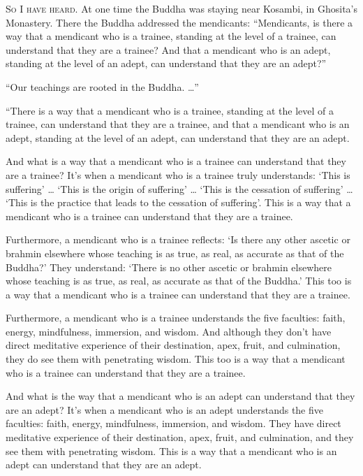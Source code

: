 \documentclass[12pt,openany]{book}%
\newcommand*{\scevam}[1]{\textsc{#1}}
\begin{document}
\scevam{So I have heard. }At one time the Buddha was staying near Kosambi, in Ghosita’s Monastery. There the Buddha addressed the mendicants: “Mendicants, is there a way that a mendicant who is a trainee, standing at the level of a trainee, can understand that they are a trainee? And that a mendicant who is an adept, standing at the level of an adept, can understand that they are an adept?” 

“Our teachings are rooted in the Buddha. …” 

“There is a way that a mendicant who is a trainee, standing at the level of a trainee, can understand that they are a trainee, and that a mendicant who is an adept, standing at the level of an adept, can understand that they are an adept. 

And what is a way that a mendicant who is a trainee can understand that they are a trainee? It’s when a mendicant who is a trainee truly understands: ‘This is suffering’ … ‘This is the origin of suffering’ … ‘This is the cessation of suffering’ … ‘This is the practice that leads to the cessation of suffering’. This is a way that a mendicant who is a trainee can understand that they are a trainee. 

Furthermore, a mendicant who is a trainee reflects: ‘Is there any other ascetic or brahmin elsewhere whose teaching is as true, as real, as accurate as that of the Buddha?’ They understand: ‘There is no other ascetic or brahmin elsewhere whose teaching is as true, as real, as accurate as that of the Buddha.’ This too is a way that a mendicant who is a trainee can understand that they are a trainee. 

Furthermore, a mendicant who is a trainee understands the five faculties: faith, energy, mindfulness, immersion, and wisdom. And although they don’t have direct meditative experience of their destination, apex, fruit, and culmination, they do see them with penetrating wisdom. This too is a way that a mendicant who is a trainee can understand that they are a trainee. 

And what is the way that a mendicant who is an adept can understand that they are an adept? It’s when a mendicant who is an adept understands the five faculties: faith, energy, mindfulness, immersion, and wisdom. They have direct meditative experience of their destination, apex, fruit, and culmination, and they see them with penetrating wisdom. This is a way that a mendicant who is an adept can understand that they are an adept. 
\end{document}

